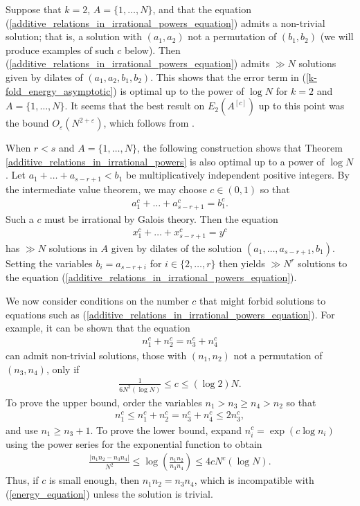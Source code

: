 \documentclass[9pt]{amsart}
\theoremstyle{my_theorem_style}
\numberwithin{definition}{section}
\newcommand{\eps}{\varepsilon}
\begin{document}
Suppose that $k = 2$, $A = \{1, \dots, N\}$, and that the equation (\ref{additive_relations_in_irrational_powers_equation}) admits a non-trivial solution; that is, a solution with $(a_1, a_2)$ not a permutation of $(b_1, b_2)$ (we will produce examples of such $c$ below). Then (\ref{additive_relations_in_irrational_powers_equation}) admits $\gg N$ solutions given by dilates of $(a_1, a_2, b_1, b_2)$. This shows that the error term in (\ref{k-fold_energy_asymptotic}) is optimal up to the power of $\log N$ for $k = 2$ and $A = \{1, \dots, N\}$. It seems that the best result on $E_2(A^{[c]})$ up to this point was the bound $O_\eps(N^{2 + \eps})$, which follows from \cite[Theorem 2]{Robert--Sargos_three-dimensional_exponential_sums_with_monomials}.

When $r < s$ and $A = \{1, \dots, N\}$, the following construction shows that Theorem \ref{additive_relations_in_irrational_powers} is also optimal up to a power of $\log N$. Let $a_1 + \dots + a_{s - r + 1} < b_1$ be multiplicatively independent positive integers. By the intermediate value theorem, we may choose $c \in (0, 1)$ so that
\begin{align*}
    a_1^c + \dots + a_{s - r + 1}^c = b_1^c.
\end{align*}
Such a $c$ must be irrational by Galois theory. Then the equation
\begin{align*}
    x_1^c + \dots + x_{s - r + 1}^c = y^c
\end{align*}
has $\gg N$ solutions in $A$ given by dilates of the solution $(a_1, \dots, a_{s - r + 1}, b_1)$. Setting the variables $b_i = a_{s - r + i}$ for $i \in \{2, \dots, r\}$ then yields $\gg N^r$ solutions to the equation (\ref{additive_relations_in_irrational_powers_equation}).

We now consider conditions on the number $c$ that might forbid solutions to equations such as (\ref{additive_relations_in_irrational_powers_equation}). For example, it can be shown that the equation
\begin{align}
\label{energy_equation}
    n_1^c + n_2^c = n_3^c + n_4^c
\end{align}
can admit non-trivial solutions, those with $(n_1, n_2)$ not a permutation of $(n_3, n_4)$, only if
\begin{align}
\label{admissable_range}
    \frac{1}{6N^2(\log{N})} \leq
    c \leq (\log{2})N.
\end{align}
To prove the upper bound, order the variables $n_1 > n_3 \geq n_4 > n_2$ so that
\begin{align*}
    n_1^c \leq n_1^c + n_2^c = n_3^c + n_4^c \leq 2n_3^c,
\end{align*}
and use $n_1 \geq n_3 + 1$. To prove the lower bound, expand $n_i^c = \exp(c \log{n_i})$ using the power series for the exponential function to obtain
\begin{align*}
    \frac{|n_1n_2 - n_3n_4|}{N^2} \leq \log\left(\frac{n_1n_2}{n_3n_4}\right) \leq 4 c N^c (\log{N}).
\end{align*}
Thus, if $c$ is small enough, then $n_1n_2 = n_3n_4$, which is incompatible with (\ref{energy_equation}) unless the solution is trivial.
\end{document}
